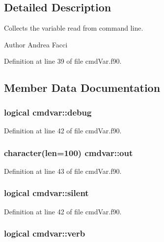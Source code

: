 \subsection{Detailed Description}
Collects the variable read from command line. \begin{DoxyAuthor}{Author}
Andrea Facci 
\end{DoxyAuthor}


Definition at line 39 of file cmd\-Var.\-f90.



\subsection{Member Data Documentation}
\hypertarget{classcmdvar_a040fa7b1b07323379cfc623dbf43d7c0}{
\subsubsection[{debug}]{\setlength{\rightskip}{0pt plus 5cm}logical cmdvar\-::debug}}\label{classcmdvar_a040fa7b1b07323379cfc623dbf43d7c0}


Definition at line 42 of file cmd\-Var.\-f90.

\hypertarget{classcmdvar_aa24632df9762e42214c48cd1f53bb6e3}{
\subsubsection[{out}]{\setlength{\rightskip}{0pt plus 5cm}character(len=100) cmdvar\-::out}}\label{classcmdvar_aa24632df9762e42214c48cd1f53bb6e3}


Definition at line 43 of file cmd\-Var.\-f90.

\hypertarget{classcmdvar_a774f2caff8f9563a52b69cf5c205da28}{
\subsubsection[{silent}]{\setlength{\rightskip}{0pt plus 5cm}logical cmdvar\-::silent}}\label{classcmdvar_a774f2caff8f9563a52b69cf5c205da28}


Definition at line 42 of file cmd\-Var.\-f90.

\hypertarget{classcmdvar_ab46a1faddb3f0a3fe76bfa461154ffcc}{
\subsubsection[{verb}]{\setlength{\rightskip}{0pt plus 5cm}logical cmdvar\-::verb}}\label{classcmdvar_ab46a1faddb3f0a3fe76bfa461154ffcc}


